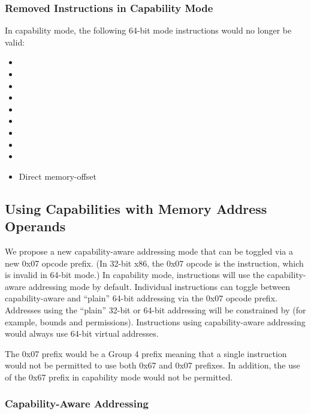 \subsubsection{Removed Instructions in Capability Mode}

In capability mode, the following 64-bit mode instructions would no
longer be valid:

\begin{itemize}
  \item {}
  \item {}
  \item {}
  \item {}
  \item {}
  \item {}
  \item {}
  \item {}
  \item {}
  \item Direct memory-offset 
\end{itemize}

\subsection{Using Capabilities with Memory Address Operands}
\label{sec:x86:capability-addressing}

We propose a new capability-aware addressing mode that can be
toggled via a new 0x07
opcode prefix.  (In 32-bit x86, the 0x07 opcode is the
 instruction, which is invalid in 64-bit mode.)
In capability mode, instructions will use
the capability-aware addressing mode by default.  Individual
instructions can toggle between capability-aware and ``plain''
64-bit addressing via the 0x07 opcode prefix.  Addresses using the
``plain'' 32-bit or 64-bit addressing will be constrained by \DDC{}
(for example, bounds and permissions).
Instructions using capability-aware addressing
would always use 64-bit virtual addresses.

The 0x07 prefix would be a Group 4 prefix meaning that a single
instruction would not be permitted to use both 0x67 and 0x07 prefixes.
In addition, the use of the 0x67 prefix in capability mode would not
be permitted.

\subsubsection{Capability-Aware Addressing}

